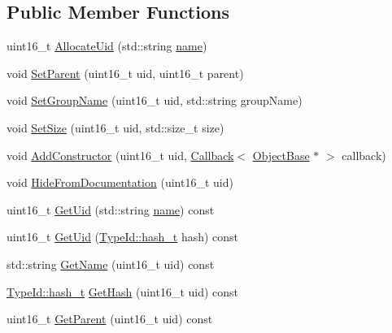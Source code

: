 \subsection*{Public Member Functions}
\begin{DoxyCompactItemize}
\item 
uint16\+\_\+t \hyperlink{classns3_1_1IidManager_adc03a8e984e092e5981e697818509233}{Allocate\+Uid} (std\+::string \hyperlink{generate__test__data__lte__spectrum__model_8m_ab74e6bf80237ddc4109968cedc58c151}{name})
\item 
void \hyperlink{classns3_1_1IidManager_a4042931260554c907699367b6811426f}{Set\+Parent} (uint16\+\_\+t uid, uint16\+\_\+t parent)
\item 
void \hyperlink{classns3_1_1IidManager_a3bc08ad1c8a26224153caacd2def37de}{Set\+Group\+Name} (uint16\+\_\+t uid, std\+::string group\+Name)
\item 
void \hyperlink{classns3_1_1IidManager_a4366ed02599a7f47b8065667f6411c3a}{Set\+Size} (uint16\+\_\+t uid, std\+::size\+\_\+t size)
\item 
void \hyperlink{classns3_1_1IidManager_a6073021a59ff1150ab155230c52c5b98}{Add\+Constructor} (uint16\+\_\+t uid, \hyperlink{classns3_1_1Callback}{Callback}$<$ \hyperlink{classns3_1_1ObjectBase}{Object\+Base} $\ast$ $>$ callback)
\item 
void \hyperlink{classns3_1_1IidManager_a62df70ccf35b9bfe34c5bc4af70d7e9d}{Hide\+From\+Documentation} (uint16\+\_\+t uid)
\item 
uint16\+\_\+t \hyperlink{classns3_1_1IidManager_ae69ae26221b11f8871596679c6e8be19}{Get\+Uid} (std\+::string \hyperlink{generate__test__data__lte__spectrum__model_8m_ab74e6bf80237ddc4109968cedc58c151}{name}) const 
\item 
uint16\+\_\+t \hyperlink{classns3_1_1IidManager_a78e3f7325e10c9e634d3354bc2a6e913}{Get\+Uid} (\hyperlink{classns3_1_1TypeId_ab3fc1475c4a0c2cfb35b976dbd609057}{Type\+Id\+::hash\+\_\+t} hash) const 
\item 
std\+::string \hyperlink{classns3_1_1IidManager_a5d68d0f0f44594dcdec239dbdb5bf53c}{Get\+Name} (uint16\+\_\+t uid) const 
\item 
\hyperlink{classns3_1_1TypeId_ab3fc1475c4a0c2cfb35b976dbd609057}{Type\+Id\+::hash\+\_\+t} \hyperlink{classns3_1_1IidManager_a9469b4d3de6e28637b01442c6ca3f6b7}{Get\+Hash} (uint16\+\_\+t uid) const 
\item 
uint16\+\_\+t \hyperlink{classns3_1_1IidManager_a504f9d76281bd6149556b1d15e80231d}{Get\+Parent} (uint16\+\_\+t uid) const 
\item 

\end{DoxyCompactItemize}
